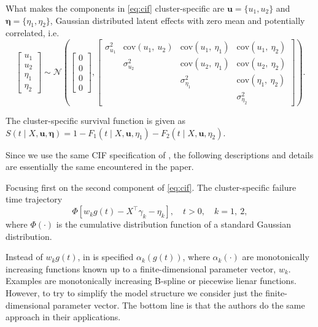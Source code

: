 What makes the components in \autoref{eq:cif} cluster-specific are
\(\bm{u} = \{u_{1}, u_{2}\}\) and \(\bm{\eta} = \{\eta_{1},
\eta_{2}\}\), Gaussian distributed latent effects with zero mean and
potentially correlated, i.e.
\[
  \begin{bmatrix} u_{1}\\u_{2}\\\eta_{1}\\\eta_{2} \end{bmatrix} \sim
  \mathcal{N} \left(\begin{bmatrix} 0\\0\\0\\0\end{bmatrix},
    \begin{bmatrix}
      \sigma_{u_{1}}^{2}&
      \text{cov}(u_{1},~u_{2})&
      \text{cov}(u_{1},~\eta_{1})&\text{cov}(u_{1},~\eta_{2})\\
      &\sigma_{u_{2}}^{2}&
      \text{cov}(u_{2},~\eta_{1})&\text{cov}(u_{2},~\eta_{2})\\
      &&\sigma_{\eta_{1}}^{2}&\text{cov}(\eta_{1},~\eta_{2})\\
      &&&\sigma_{\eta_{2}}^{2}
    \end{bmatrix}\right).
\]

The cluster-specific survival function is given as \(S(t \mid X, \bm{u},
\bm{\eta}) = 1 - F_{1} (t \mid X, \bm{u}, \eta_{1}) - F_{2} (t \mid X,
\bm{u}, \eta_{2})\).

Since we use the same CIF specification of , the
following descriptions and details are essentially the same encountered
in the paper.

Focusing first on the second component of \autoref{eq:cif}. The
cluster-specific failure time trajectory
\[
  \Phi[w_{k} g(t) - X^{\top}\gamma_{k} - \eta_{k}],
  \quad t > 0, \quad k = 1, ~2,
\]
where \(\Phi(\cdot)\) is the cumulative distribution function of a
standard Gaussian distribution.

Instead of \(w_{k} g(t)\), in  is specified
\(\alpha_{k}(g(t))\), where \(\alpha_{k}(\cdot)\) are monotonically
increasing functions known up to a finite-dimensional parameter vector,
\(w_{k}\). Examples are monotonically increasing B-spline or piecewise
lienar functions. However, to try to simplify the model structure we
consider just the finite-dimensional parameter vector. The bottom line
is that the authors do the same approach in their applications.

